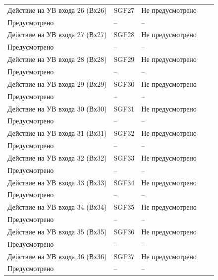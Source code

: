 \begin{longtable}{|>{\centering\arraybackslash}m{5.3cm}|>{\centering\arraybackslash}m{3.3cm}|>{\centering\arraybackslash}m{4.2cm}|>{\centering\arraybackslash}m{1.8cm}|>{\centering\arraybackslash}m{1cm}|}
\hline
\centering Действие на УВ входа 26 (Вх26)  & \centering SGF27 & \centering Не предусмотрено \\ Предусмотрено & \centering -- & \centering \arraybackslash -- \\
\hline
\centering Действие на УВ входа 27 (Вх27)  & \centering SGF28 & \centering Не предусмотрено \\ Предусмотрено & \centering -- & \centering \arraybackslash -- \\
\hline
\centering Действие на УВ входа 28 (Вх28)  & \centering SGF29 & \centering Не предусмотрено \\ Предусмотрено & \centering -- & \centering \arraybackslash -- \\
\hline
\centering Действие на УВ входа 29 (Вх29)  & \centering SGF30 & \centering Не предусмотрено \\ Предусмотрено & \centering -- & \centering \arraybackslash -- \\
\hline
\centering Действие на УВ входа 30 (Вх30)  & \centering SGF31 & \centering Не предусмотрено \\ Предусмотрено & \centering -- & \centering \arraybackslash -- \\
\hline
\centering Действие на УВ входа 31 (Вх31)  & \centering SGF32 & \centering Не предусмотрено \\ Предусмотрено & \centering -- & \centering \arraybackslash -- \\
\hline
\centering Действие на УВ входа 32 (Вх32)  & \centering SGF33 & \centering Не предусмотрено \\ Предусмотрено & \centering -- & \centering \arraybackslash -- \\
\hline
\centering Действие на УВ входа 33 (Вх33)  & \centering SGF34 & \centering Не предусмотрено \\ Предусмотрено & \centering -- & \centering \arraybackslash -- \\
\hline
\centering Действие на УВ входа 34 (Вх34)  & \centering SGF35 & \centering Не предусмотрено \\ Предусмотрено & \centering -- & \centering \arraybackslash -- \\
\hline
\centering Действие на УВ входа 35 (Вх35)  & \centering SGF36 & \centering Не предусмотрено \\ Предусмотрено & \centering -- & \centering \arraybackslash -- \\
\hline
\centering Действие на УВ входа 36 (Вх36)  & \centering SGF37 & \centering Не предусмотрено \\ Предусмотрено & \centering -- & \centering \arraybackslash -- \\

\end{longtable}
